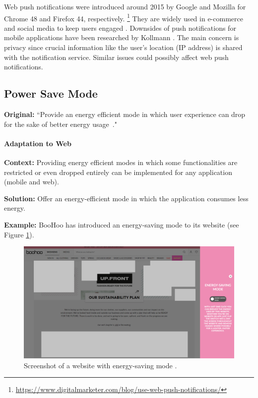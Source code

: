 Web push notifications were introduced around 2015 by Google and Mozilla for Chrome 48 and Firefox 44, respectively. \footnote{\url{https://www.digitalmarketer.com/blog/use-web-push-notifications/}} They are widely used in e-commerce and social media to keep users engaged \cite{blog-web-push-notifications}. Downsides of push notifications for mobile applications have been researched by Kollmann \etal \cite{Kollmann2017}. The main concern is privacy since crucial information like the user's location (\ie IP address) is shared with the notification service. Similar issues could possibly affect web push notifications.

\subsection{Power Save Mode} \label{sec:patterns-PowerSaveMode}
\textbf{Original:} ``Provide an energy efficient mode in which user experience can drop for the sake of better energy usage~\cite{cruz2019catalog}."

\paragraph{Adaptation to Web}\mbox{}

\textbf{Context:} Providing energy efficient modes in which some functionalities are restricted or even dropped entirely can be implemented for any application (mobile and web).

\textbf{Solution:} Offer an energy-efficient mode in which the application consumes less energy.

\textbf{Example:} BooHoo has introduced an energy-saving mode to its website (see Figure \ref{fig:boohoo}).

\begin{figure}
    \centering
    \includegraphics[width=\linewidth]{RQ1/Img/boohoo.png}
    \caption{Screenshot of a website with energy-saving mode \cite{boohoo-website}.}
    \label{fig:boohoo}
\end{figure}

